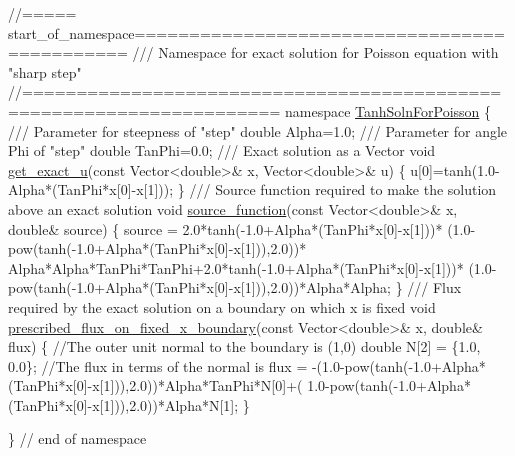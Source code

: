  
\begin{DoxyCodeInclude}
\textcolor{comment}{//===== start\_of\_namespace=============================================}
\textcolor{comment}{/// Namespace for exact solution for Poisson equation with "sharp step" }
\textcolor{comment}{}\textcolor{comment}{//=====================================================================}
\textcolor{keyword}{namespace }\hyperlink{namespaceTanhSolnForPoisson}{TanhSolnForPoisson}
\{
\textcolor{comment}{}
\textcolor{comment}{ /// Parameter for steepness of "step"}
\textcolor{comment}{} \textcolor{keywordtype}{double} Alpha=1.0;
\textcolor{comment}{}
\textcolor{comment}{ /// Parameter for angle Phi of "step"}
\textcolor{comment}{} \textcolor{keywordtype}{double} TanPhi=0.0;
\textcolor{comment}{}
\textcolor{comment}{ /// Exact solution as a Vector}
\textcolor{comment}{} \textcolor{keywordtype}{void} \hyperlink{namespaceTanhSolnForPoisson_af7896e9c18ce6438c73ae2a875e8b7de}{get\_exact\_u}(\textcolor{keyword}{const} Vector<double>& x, Vector<double>& u)
 \{
  u[0]=tanh(1.0-Alpha*(TanPhi*x[0]-x[1]));
 \}
\textcolor{comment}{}
\textcolor{comment}{ /// Source function required to make the solution above an exact solution }
\textcolor{comment}{} \textcolor{keywordtype}{void} \hyperlink{namespaceTanhSolnForPoisson_a967bc28320e02534beb714846b63e251}{source\_function}(\textcolor{keyword}{const} Vector<double>& x, \textcolor{keywordtype}{double}& source)
 \{
  source = 2.0*tanh(-1.0+Alpha*(TanPhi*x[0]-x[1]))*
   (1.0-pow(tanh(-1.0+Alpha*(TanPhi*x[0]-x[1])),2.0))*
   Alpha*Alpha*TanPhi*TanPhi+2.0*tanh(-1.0+Alpha*(TanPhi*x[0]-x[1]))*
   (1.0-pow(tanh(-1.0+Alpha*(TanPhi*x[0]-x[1])),2.0))*Alpha*Alpha;
 \}
\textcolor{comment}{}
\textcolor{comment}{ /// Flux required by the exact solution on a boundary on which x is fixed}
\textcolor{comment}{} \textcolor{keywordtype}{void} \hyperlink{namespaceTanhSolnForPoisson_a0e99ccf27df36f28f091de6d57484172}{prescribed\_flux\_on\_fixed\_x\_boundary}(\textcolor{keyword}{const} Vector<double>& x, 
                                          \textcolor{keywordtype}{double}& flux)
 \{
  \textcolor{comment}{//The outer unit normal to the boundary is (1,0)}
  \textcolor{keywordtype}{double} N[2] = \{1.0, 0.0\};
  \textcolor{comment}{//The flux in terms of the normal is}
  flux = 
   -(1.0-pow(tanh(-1.0+Alpha*(TanPhi*x[0]-x[1])),2.0))*Alpha*TanPhi*N[0]+(
   1.0-pow(tanh(-1.0+Alpha*(TanPhi*x[0]-x[1])),2.0))*Alpha*N[1];
 \}
 
\} \textcolor{comment}{// end of namespace}

\end{DoxyCodeInclude}




